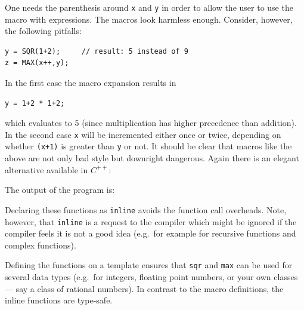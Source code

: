 \noindent
One needs the parenthesis around \verb+x+ and \verb+y+ in order to allow the user
to use the macro with expressions. The macros look harmless enough. Consider,
however, the following pitfalls:
{\small \begin{verbatim}
y = SQR(1+2);     // result: 5 instead of 9
z = MAX(x++,y);
\end{verbatim}}
\noindent
In the first case the macro expansion results in 
{\small \begin{verbatim}
y = 1+2 * 1+2;
\end{verbatim}}
\noindent
which evaluates to 5 (since multiplication has higher precedence than addition).
In the second case \verb+x+ will be incremented either once or twice, depending
on whether \verb&(x+1)& is greater than \verb+y+ or not. It should be clear that
macros like the above are not only bad style but downright dangerous. Again there
is an elegant alternative available in $C^{++}$:

\noindent {\small }

 

The output of the program is:


\noindent
Declaring these functions as \verb+inline+  avoids the function
call overheads.
Note, however, that \verb+inline+ is a request to the compiler which might be
ignored if the compiler feels it is not a good idea (e.g.\ for example for recursive
functions and complex functions).

Defining the functions on a template
  ensures that \verb+sqr+
and \verb+max+ can be used for several data types (e.g.\ for integers,
floating point numbers, or your own classes --- say a class of rational numbers).
In contrast to the  macro  definitions, the inline functions
 are type-safe.



